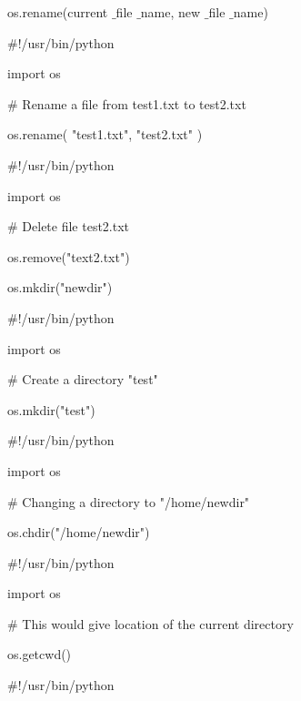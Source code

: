 \documentclass[a4paper,12pt]{report}
\begin{document}
\vspace{14pt}
\noindent 
os.rename(current $  \_  $file $  \_  $name, new $  \_  $file $  \_  $name) \par
\vspace{14pt}
\noindent 
 $  \#  $!/usr/bin/python \par
\noindent 
import os \par
\vspace{12pt}
\noindent 
 $  \#  $ Rename a file from test1.txt to test2.txt \par
\noindent 
os.rename( "test1.txt", "test2.txt" ) \par
\vspace{14pt}
\noindent 
 $  \#  $!/usr/bin/python \par
\noindent 
import os \par
\vspace{12pt}
\noindent 
 $  \#  $ Delete file test2.txt \par
\noindent 
os.remove("text2.txt") \par
\vspace{14pt}
\noindent 
os.mkdir("newdir") \par
\vspace{14pt}
\noindent 
 $  \#  $!/usr/bin/python \par
\noindent 
import os \par
\vspace{12pt}
\noindent 
 $  \#  $ Create a directory "test" \par
\noindent 
os.mkdir("test") \par
\vspace{14pt}
\noindent 
 $  \#  $!/usr/bin/python \par
\noindent 
import os \par
\vspace{12pt}
\noindent 
 $  \#  $ Changing a directory to "/home/newdir" \par
\noindent 
os.chdir("/home/newdir") \par
\vspace{14pt}
\noindent 
 $  \#  $!/usr/bin/python \par
\noindent 
import os \par
\vspace{12pt}
\noindent 
 $  \#  $ This would give location of the current directory \par
\noindent 
os.getcwd() \par
\vspace{14pt}
\noindent 
 $  \#  $!/usr/bin/python \par
\end{document}
